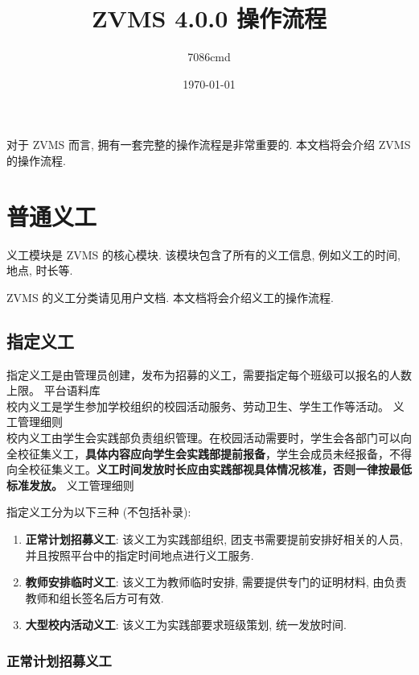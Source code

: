 \documentclass{article}
\title{ZVMS 4.0.0 操作流程}
\author{7086cmd}
\date{\today}
\begin{document}
\maketitle

对于 ZVMS 而言, 拥有一套完整的操作流程是非常重要的. 本文档将会介绍 ZVMS 的操作流程.

\tableofcontents

\newpage

\section{普通义工}

义工模块是 ZVMS 的核心模块. 该模块包含了所有的义工信息, 例如义工的时间, 地点, 时长等.

ZVMS 的义工分类请见用户文档. 本文档将会介绍义工的操作流程.

\subsection{指定义工}

\begin{mdframed}
  \fangsong
  指定义工是由管理员创建，发布为招募的义工，需要指定每个班级可以报名的人数上限。 \hfill 平台语料库 \\
  校内义工是学生参加学校组织的校园活动服务、劳动卫生、学生工作等活动。 \hfill 义工管理细则 \\
  校内义工由学生会实践部负责组织管理。在校园活动需要时，学生会各部门可以向全校征集义工，\textbf{具体内容应向学生会实践部提前报备}，学生会成员未经报备，不得向全校征集义工。\textbf{义工时间发放时长应由实践部视具体情况核准，否则一律按最低标准发放。} \hfill 义工管理细则
\end{mdframed}

指定义工分为以下三种 (不包括补录):

\begin{enumerate}
  \item \textbf{正常计划招募义工}: 该义工为实践部组织, 团支书需要提前安排好相关的人员, 并且按照平台中的指定时间地点进行义工服务.
  \item \textbf{教师安排临时义工}: 该义工为教师临时安排, 需要提供专门的证明材料, 由负责教师和组长签名后方可有效.
  \item \textbf{大型校内活动义工}: 该义工为实践部要求班级策划, 统一发放时间.
\end{enumerate}

\subsubsection{正常计划招募义工}
\end{document}
